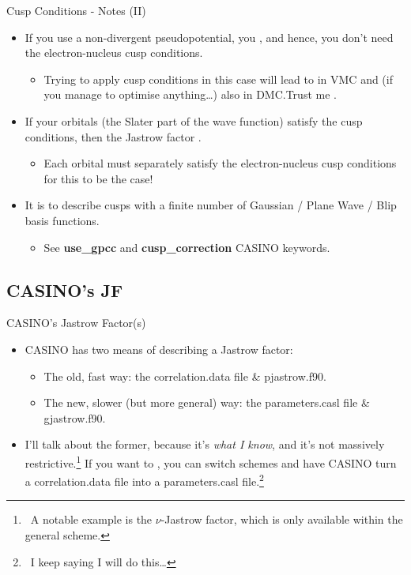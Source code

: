 \documentclass[12pt, pdf, hyperref={draft}, usenames, dvipsnames,
aspectratio=169]{beamer}
\newcommand{\red}[1]{{\bf\color{LancsRed}{#1}}}
\newcommand{\green}[1]{{\bf\color{ForestGreen}{#1}}}
\begin{document}
\begin{frame}{Cusp Conditions - Notes (II)}
\begin{itemize}
  \item If you use a non-divergent pseudopotential, you \green{don't have a
  cusp}, and hence, you don't need the electron-nucleus cusp conditions.
  \begin{itemize}
    \item Trying to apply cusp conditions in this case will lead to \red{bad
    behaviour} in VMC and (if you manage to optimise anything\ldots) also in
    DMC.\@ Trust me \Winkey.
  \end{itemize}
  \item If your orbitals (the Slater part of the wave function) satisfy the
  cusp conditions, then the Jastrow factor \green{doesn't need to}.
  \begin{itemize}
    \item Each orbital must separately satisfy the electron-nucleus cusp
    conditions for this to be the case!
  \end{itemize}
  \item It is \red{impossible} to describe cusps with a finite number of
  Gaussian / Plane Wave / Blip basis functions.
  \begin{itemize}
    \item See \textbf{use\_gpcc} and \textbf{cusp\_correction} CASINO keywords.
  \end{itemize}
\end{itemize}
\end{frame}

\subsection{CASINO's JF}\label{sub:casino_jastrow}

\begin{frame}{CASINO's Jastrow Factor\@(s)}

\begin{itemize}
  \item CASINO has two means of describing a Jastrow factor:
  \begin{itemize}
    \item The old, fast way: the correlation.data file \& pjastrow.f90.
    \item The new, slower (but more general) way: the parameters.casl file \&
    gjastrow.f90.
  \end{itemize}
  \item I'll talk about the former, because it's \textit{what I know}, and
  it's not massively restrictive.\footnote{\ A notable
  example is the $\nu$-Jastrow factor, which is only available within the
  general scheme.} If you want to \green{play around}, you can switch schemes
  and have CASINO turn a correlation.data file into a parameters.casl
  file.\footnote{\ I keep saying I will do this\ldots}
\end{itemize}
\end{frame}
\end{document}
